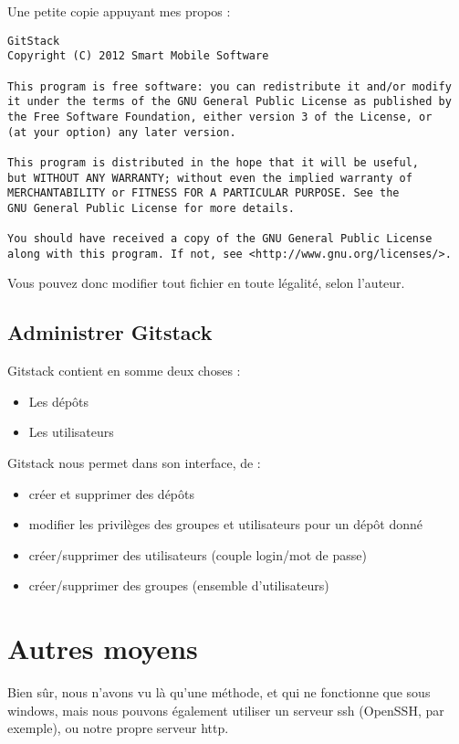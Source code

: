 Une petite copie appuyant mes propos :
\begin{verbatim}
GitStack
Copyright (C) 2012 Smart Mobile Software

This program is free software: you can redistribute it and/or modify
it under the terms of the GNU General Public License as published by
the Free Software Foundation, either version 3 of the License, or
(at your option) any later version.

This program is distributed in the hope that it will be useful,
but WITHOUT ANY WARRANTY; without even the implied warranty of
MERCHANTABILITY or FITNESS FOR A PARTICULAR PURPOSE. See the
GNU General Public License for more details.

You should have received a copy of the GNU General Public License
along with this program. If not, see <http://www.gnu.org/licenses/>.
\end{verbatim}

Vous pouvez donc modifier tout fichier en toute légalité, selon l'auteur.

\newpage
\subsection{Administrer Gitstack}

Gitstack contient en somme deux choses :
\begin{itemize}
\item Les dépôts
\item Les utilisateurs\\
\end{itemize}

Gitstack nous permet dans son interface, de :
\begin{itemize}
\item créer et supprimer des dépôts
\item modifier les privilèges des groupes et utilisateurs pour un dépôt donné
\item créer/supprimer des utilisateurs (couple login/mot de passe) 
\item créer/supprimer des groupes (ensemble d'utilisateurs)
\end{itemize}

\section{Autres moyens}

Bien sûr, nous n'avons vu là qu'une méthode, et qui ne fonctionne que sous windows, mais nous pouvons également utiliser un serveur ssh (OpenSSH, par exemple), ou notre propre serveur http.\\

